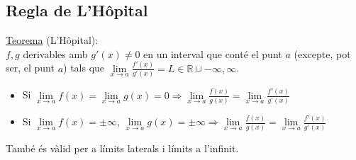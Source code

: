 \subsection{Regla de L'Hôpital}
\underline{Teorema} (L'Hôpital):\\
$f, g$ derivables amb $g'(x) \neq 0$ en un interval que conté el punt $a$ (excepte, pot ser, el punt $a$) tals que $\lim\limits_{x \rightarrow a} \frac{f'(x)}{g'(x)} = L \in \mathbb{R} \cup {-\infty, \infty}$.
\begin{itemize}
    \item Si $\lim\limits_{x \rightarrow a} f(x) = \lim\limits_{x \rightarrow a} g(x) = 0 \Rightarrow \lim\limits_{x \rightarrow a} \frac{f(x)}{g(x)} = \lim\limits_{x \rightarrow a} \frac{f'(x)}{g'(x)}$
    \item Si $\lim\limits_{x \rightarrow a} f(x) = \pm \infty$, $\lim\limits_{x \rightarrow a} g(x) = \pm \infty \Rightarrow \lim\limits_{x \rightarrow a} \frac{f(x)}{g(x)} = \lim\limits_{x \rightarrow a} \frac{f'(x)}{g'(x)}$
\end{itemize}
També és vàlid per a límits laterals i límits a l'infinit. 

